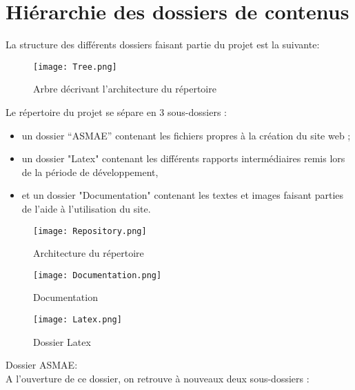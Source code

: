 \chapter{Hiérarchie des dossiers de contenus}

La structure des différents dossiers faisant partie du projet est la suivante:

\begin{figure}[!ht]
\centering
\texttt{[image: Tree.png]}
\caption{Arbre décrivant l'architecture du répertoire}
\end{figure}

Le répertoire du projet se sépare en 3 sous-dossiers :

\begin{itemize}
\item un dossier \enquote{ASMAE} contenant les fichiers propres à la création
du site web ;
\item un dossier "Latex" contenant les différents rapports intermédiaires
remis lors de la période de développement,
\item et un dossier "Documentation" contenant les textes et images faisant
parties de l'aide à l'utilisation du site.
\end{itemize}

\begin{figure}[H]
\centering
\texttt{[image: Repository.png]}
\caption{Architecture du répertoire}
\end{figure}

\begin{figure}[H]
\centering
\texttt{[image: Documentation.png]}
\caption{Documentation}
\end{figure}

\begin{figure}[H]
\centering
\texttt{[image: Latex.png]}
\caption{Dossier Latex}
\end{figure}

Dossier ASMAE:\\

A l'ouverture de ce dossier, on retrouve à nouveaux deux sous-dossiers :\\

